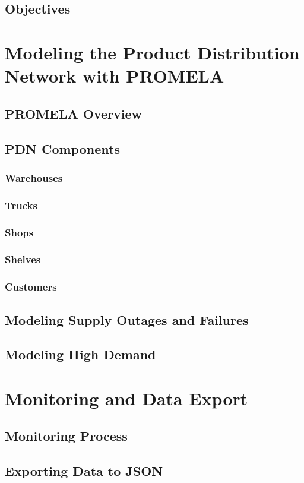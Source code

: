 \documentclass[12pt]{report}
\begin{document}
\section{Objectives}

\chapter{Modeling the Product Distribution Network with PROMELA}
\section{PROMELA Overview}
\section{PDN Components}
\subsection{Warehouses}
\subsection{Trucks}
\subsection{Shops}
\subsection{Shelves}
\subsection{Customers}
\section{Modeling Supply Outages and Failures}
\section{Modeling High Demand}

\chapter{Monitoring and Data Export}
\section{Monitoring Process}
\section{Exporting Data to JSON}
\end{document}
